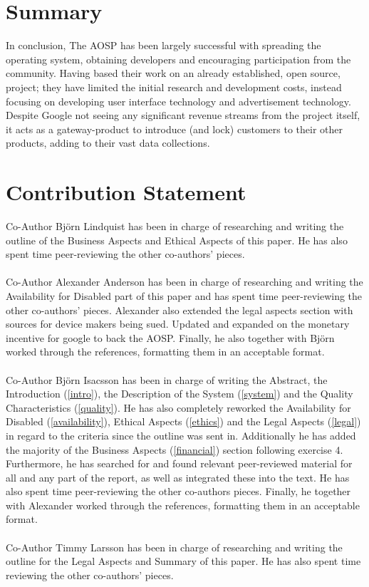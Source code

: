 \documentclass[conference]{IEEEtran}
\begin{document}
\section{Summary}
\label{summary}

In conclusion, The AOSP has been largely successful with spreading the operating system, obtaining developers and encouraging participation from the community. Having based their work on an already established, open source, project; they have limited the initial research and development costs, instead focusing on developing user interface technology and advertisement technology. Despite Google not seeing any significant revenue streams from the project itself, it acts as a gateway-product to introduce (and lock) customers to their other products, adding to their vast data collections.


\section{Contribution Statement}
\label{contribution}

Co-Author Björn Lindquist has been in charge of researching and writing the outline of the Business Aspects and Ethical Aspects of this paper. He has also spent time peer-reviewing the other co-authors' pieces.
\\\\Co-Author Alexander Anderson has been in charge of researching and writing the Availability for Disabled part of this paper and has spent time peer-reviewing the other co-authors' pieces. Alexander also extended the legal aspects section with sources for device makers being sued. Updated and expanded on the monetary incentive for google to back the AOSP. Finally, he also together with Björn worked through the references, formatting them in an acceptable format. 
\\\\Co-Author Björn Isacsson has been in charge of writing the Abstract, the Introduction (\ref{intro}), the Description of the System (\ref{system}) and the Quality Characteristics (\ref{quality}). He has also completely reworked the Availability for Disabled (\ref{availability}), Ethical Aspects (\ref{ethics}) and the Legal Aspects (\ref{legal}) in regard to the criteria since the outline was sent in. Additionally he has added the majority of the Business Aspects (\ref{financial}) section following exercise 4. Furthermore, he has searched for and found relevant peer-reviewed material for all and any part of the report, as well as integrated these into the text. He has also spent time peer-reviewing the other co-authors pieces. Finally, he together with Alexander worked through the references, formatting them in an acceptable format.
\\\\Co-Author Timmy Larsson has been in charge of researching and writing the outline for the Legal Aspects and Summary of this paper. He has also spent time reviewing the other co-authors' pieces.
\end{document}
